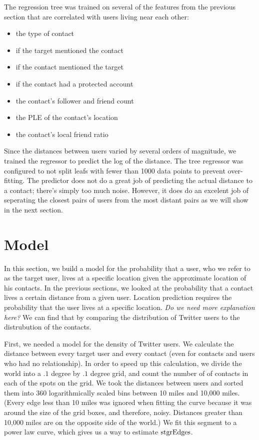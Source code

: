 The regression tree was trained on several of the features from the previous
section that are correlated with users living near each other:
\begin{itemize}
\item the type of contact
\item if the target mentioned the contact
\item if the contact mentioned the target
\item if the contact had a protected account
\item the contact's follower and friend count
\item the PLE of the contact's location
\item the contact's local friend ratio
\end{itemize}
%
Since the distances between users varied by several orders of magnitude, we
trained the regressor to predict the log of the distance.
%
The tree regressor was configured to not split leafs with fewer than 1000 data
points to prevent over-fitting.
%
The predictor does not do a great job of predicting the actual distance to a
contact; there's simply too much noise.
%
However, it does do an excelent job of seperating the closest pairs of users
from the most distant pairs as we will show in the next section.


\section{Model}
\label{sec:model}

In this section, we build a model for the probability that a user, who we refer
%
to as the target user, lives at a specific location given the approximate
location of his contacts.
%
In the previous sections, we looked at the probability that a contact lives a
certain distance from a given user.
%
Location prediction requires the probability that the user lives at a specific
location.
\emph{Do we need more explanation here?}
%
We can find that by comparing the distribution of Twitter users to the
distrubution of the contacts.

First, we needed a model for the density of Twitter users.
%
We calculate the distance between every target user and every contact
(even for contacts and users who had no relationship).
%
In order to speed up this calculation, we divide the world into a $.1$ degree
by $.1$ degree grid, and count the number of of contacts in each of the spots
on the grid.
%
We took the distances between users and sorted them into 360 logarithmically
scaled bins between 10 miles and 10,000 miles.
%
(Every edge less than 10 miles was ignored when fitting the curve because it
was around the size of the grid boxes, and therefore, noisy. Distances greater
than 10,000 miles are on the opposite side of the world.)
%
We fit this segment to a power law curve, which gives us a way to estimate
$\operatorname{stgrEdges}$.

